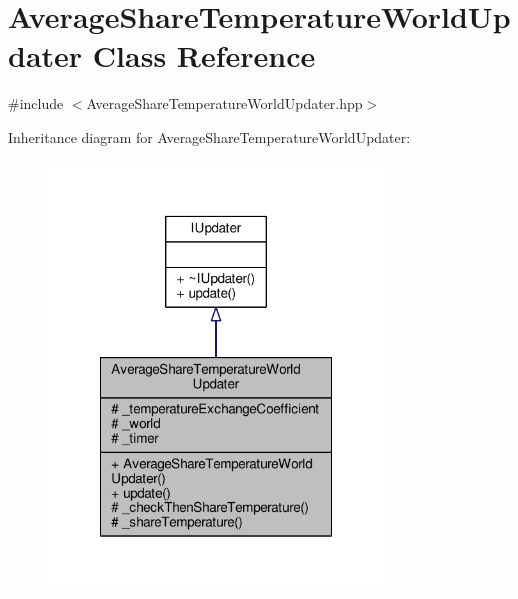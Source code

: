 \hypertarget{class_average_share_temperature_world_updater}{\section{Average\-Share\-Temperature\-World\-Updater Class Reference}
\label{class_average_share_temperature_world_updater}
}


{\ttfamily \#include $<$Average\-Share\-Temperature\-World\-Updater.\-hpp$>$}



Inheritance diagram for Average\-Share\-Temperature\-World\-Updater\-:
\nopagebreak
\begin{figure}[H]
\begin{center}
\leavevmode
\includegraphics[width=252pt]{class_average_share_temperature_world_updater__inherit__graph}
\end{center}
\end{figure}


